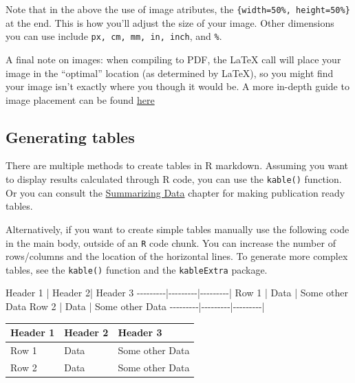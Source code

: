 \documentclass[
]{book}
\newenvironment{Shaded}{\begin{snugshade}}{\end{snugshade}}
\newcommand{\NormalTok}[1]{#1}
\begin{document}
Note that in the above the use of image atributes, the \texttt{\{width=50\%,\ height=50\%\}} at the end. This is how you'll adjust the size of your image. Other dimensions you can use include \texttt{px,\ cm,\ mm,\ in,\ inch}, and \texttt{\%}.

A final note on images: when compiling to PDF, the LaTeX call will place your image in the ``optimal'' location (as determined by LaTeX), so you might find your image isn't exactly where you though it would be. A more in-depth guide to image placement can be found \href{https://rpubs.com/RatherBit/90926}{here}

\hypertarget{generating-tables}{%
\subsection{Generating tables}\label{generating-tables}}

There are multiple methods to create tables in R markdown. Assuming you want to display results calculated through R code, you can use the \texttt{kable()} function. Or you can consult the \protect\hyperlink{summarizing-data}{Summarizing Data} chapter for making publication ready tables.

Alternatively, if you want to create simple tables manually use the following code in the main body, outside of an \texttt{R} code chunk. You can increase the number of rows/columns and the location of the horizontal lines. To generate more complex tables, see the \texttt{kable()} function and the \texttt{kableExtra} package.

\begin{Shaded}
\begin{Highlighting}[]
\NormalTok{Header 1 | Header 2| Header 3}
\NormalTok{{-}{-}{-}{-}{-}{-}{-}{-}{-}|{-}{-}{-}{-}{-}{-}{-}{-}{-}|{-}{-}{-}{-}{-}{-}{-}{-}{-}|}
\NormalTok{Row 1    | Data    | Some other Data}
\NormalTok{Row 2    | Data    | Some other Data}
\NormalTok{{-}{-}{-}{-}{-}{-}{-}{-}{-}|{-}{-}{-}{-}{-}{-}{-}{-}{-}|{-}{-}{-}{-}{-}{-}{-}{-}{-}|}
\end{Highlighting}
\end{Shaded}

\begin{longtable}[]{@{}lll@{}}
\toprule\noalign{}
Header 1 & Header 2 & Header 3 \\
\midrule\noalign{}
\endhead
\bottomrule\noalign{}
\endlastfoot
Row 1 & Data & Some other Data \\
Row 2 & Data & Some other Data \\
\end{longtable}
\end{document}
